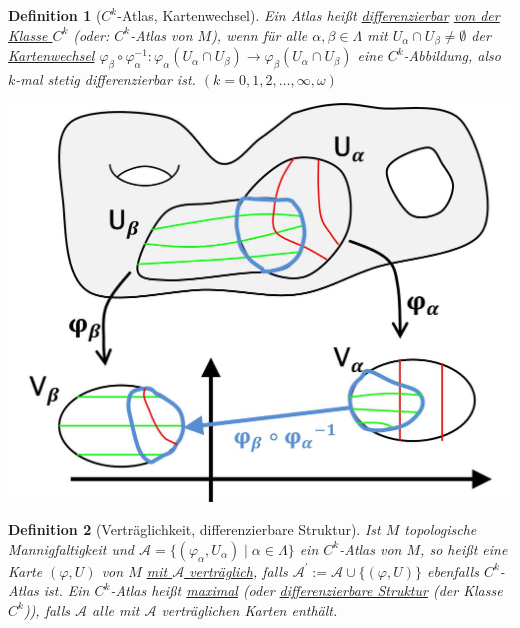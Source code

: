 \documentclass[a4paper,11pt,notitlepage]{report}
\newtheorem{definition}{Definition}[chapter]
\begin{document}
\begin{definition}[$C^k$-Atlas, Kartenwechsel]
	Ein Atlas heißt \underline{differenzierbar} \underline{von der Klasse $C^k$} (oder: $C^k$-Atlas von $M$), wenn für alle $\alpha, \beta \in \Lambda$ mit $U_\alpha \cap U_\beta \neq \emptyset$ der \underline{Kartenwechsel} $\varphi_\beta \circ \varphi_\alpha^{-1} \colon \varphi_\alpha(U_\alpha \cap U_\beta) \rightarrow \varphi_\beta(U_\alpha \cap U_\beta)$ eine $C^k$-Abbildung, also $k$-mal stetig differenzierbar ist. $(k=0,1,2,\ldots,\infty,\omega)$
	\newline
\end{definition}
\begin{center}
	\includegraphics[scale=0.4]{images/Kartenwechsel.jpg}
\end{center} 
 
\begin{definition}[Verträglichkeit, differenzierbare Struktur]
	Ist $M$ topologische Mannigfaltigkeit und $\mathcal{A}=\{(\varphi_\alpha,U_\alpha) \mid \alpha \in \Lambda\}$ ein $C^k$-Atlas von $M$, so heißt eine Karte $(\varphi,U)$ von $M$ \underline{mit $\mathcal{A}$ verträglich}, falls $\mathcal{A}^\prime := \mathcal{A} \cup \{(\varphi,U)\}$ ebenfalls $C^k$-Atlas ist. 
	Ein $C^k$-Atlas heißt \underline{maximal} (oder \underline{differenzierbare Struktur} (der Klasse $C^k$)), falls $\mathcal{A}$ alle mit $\mathcal{A}$ verträglichen Karten enthält.
\end{definition} 
\end{document}
